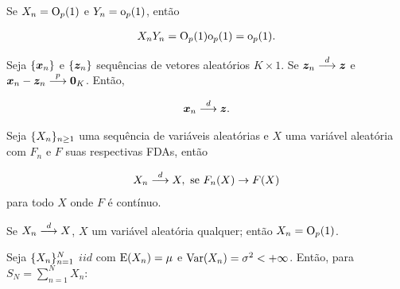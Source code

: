 \documentclass[11pt, oneside, a4paper, article]{article}
\numberwithin{equation}{section}
\begin{document}
\begin{description}
\begin{description}
\begin{defn}
Se
$X_{n} = \text{O}_{p}(1)$ e $Y_{n} = \text{o}_{p}(1)$, então

\vspace{-1 em}
\begin{align*}
	X_{n} Y_{n} = \text{O}_{p}(1) \text{o}_{p}(1) = \text{o}_{p}(1).
\end{align*}
\end{defn}

\begin{defn} \label{def:equiv:assin}
Seja
$\{\boldsymbol{x}_{n}\}$ e $\{\boldsymbol{z}_{n}\}$
sequências de vetores aleatórios $K \times 1$.
Se $\boldsymbol{z}_{n}  \overset{d}{\longrightarrow}  \boldsymbol{z}$ e 
$\boldsymbol{x}_{n} - \boldsymbol{z}_{n}  \overset{p}{\longrightarrow}  \boldsymbol{0}_{K}$.
Então, 

\vspace{-1 em}
\begin{align*}
\boldsymbol{x}_{n}  \overset{d}{\longrightarrow}  \boldsymbol{z}.
\end{align*}

\end{defn}

\begin{defn}
Seja
$\{X_{n}\}_{n \geq 1}$  uma sequência de variáveis aleatórias e $X$ uma variável aleatória com $F_{n}$ e $F$ suas respectivas FDAs, então

\begin{align*}
	X_{n}  \overset{d}{\longrightarrow}  X, \text{ se } F_{n}(X) \to F(X)
\end{align*}
\noindent
para todo $X$ onde $F$ é contínuo.
\end{defn}

\begin{defn}
Se $X_{n}  \overset{d}{\longrightarrow}  X$, $X$ um variável aleatória qualquer; então $X_{n} = \text{O}_{p}(1)$.
\end{defn}

\begin{defn} \label{def:tcl}
Seja $\{X_{n}\}_{n = 1}^{N}$ $iid$ com $\text{E}(X_{n}) = \mu$ e $\text{Var}(X_{n}) = \sigma^{2} < + \infty$.
Então, para $S_{N} = \sum_{n=1}^{N} X_{n}$:


\end{defn}
\end{description}
\end{description}
\end{document}
